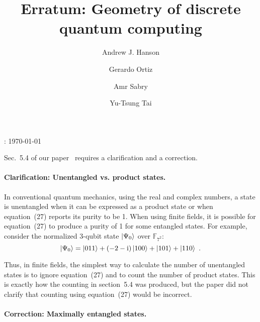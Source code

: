\documentclass{iopart}
\newcommand{\ff}[1]{\mathbb{F}_{#1}}
\begin{document}
\title{Erratum: Geometry of discrete quantum computing}


\author{Andrew J. Hanson}


\address{School of Informatics and Computing, Indiana University, Bloomington,
IN 47405, U.S.A}


\author{Gerardo Ortiz}


\address{Department of Physics, Indiana University, Bloomington, IN 47405,
U.S.A}


\author{Amr Sabry}


\address{School of Informatics and Computing, Indiana University, Bloomington,
IN 47405, U.S.A}


\author{Yu-Tsung Tai}


\address{Department of Mathematics, Indiana University, Bloomington, IN 47405,
U.S.A}


\address{School of Informatics and Computing, Indiana University, Bloomington,
IN 47405, U.S.A}


: {\today}

\maketitle

\noindent Sec.~5.4 of our paper~\cite{geometry} requires a clarification and a correction. 

\paragraph*{Clarification: Unentangled vs. product states.}

In conventional quantum mechanics, using the real and complex numbers,
a state is unentangled when it can be expressed as a product state
or when equation~(27) reports its purity to be 1. When using finite
fields, it is possible for equation~(27) to produce a purity of 1
for some entangled states. For example, consider the normalized 3-qubit
state $\ket{\Psi_{0}}$ over $\ff{7^{2}}$: 
\[
\ket{\Psi_{0}}=\ket{011}+\left(-2-\mathrm{i}\right)\ket{100}+\ket{101}+\ket{110}\textrm{ .}
\]


Thus, in finite fields, the simplest way to calculate the number of
unentangled states is to ignore equation~(27) and to count the number
of product states. This is exactly how the counting in section~5.4
was produced, but the paper did not clarify that counting using equation~(27)
would be incorrect.


\paragraph*{Correction: Maximally entangled states.}
\end{document}
